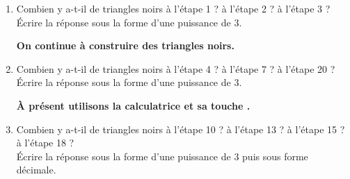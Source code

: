 \begin{changemargin}{-15mm}{-15mm}
\begin{activite}
   \begin{enumerate}
      \item Combien y a-t-il de triangles noirs à l'étape 1 ? à l'étape 2 ? à l'étape 3 ?\\Écrire la réponse sous la forme d'une puissance de \num{3}.        
      \begin{center}
      {\bfseries On continue à construire des triangles noirs.}
      \end{center}
      \item Combien y a-t-il de triangles noirs à l'étape 4 ? à l'étape 7 ? à l'étape 20 ?\\Écrire la réponse sous la forme d'une puissance de \num{3}.
      \begin{center}
      {\bfseries À présent utilisons la calculatrice et sa touche .}
      \end{center}
      \item Combien y a-t-il de triangles noirs à l'étape 10 ? à l'étape 13 ? à l'étape 15 ? à l'étape 18 ?\\Écrire la réponse sous la forme d'une puissance de \num{3} puis sous forme décimale.
   \end{enumerate}
   \vspace*{-10mm}
   \begin{center}
   \end{center}
\end{activite}
\end{changemargin}